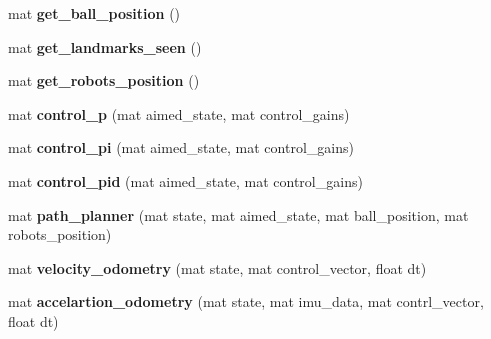 \begin{DoxyCompactItemize}
mat {\bfseries get\+\_\+ball\+\_\+position} ()
\item 
\mbox{\label{class_robot_navigation_acc50daa5ac82e2900f87d2b312afc518}} 
mat {\bfseries get\+\_\+landmarks\+\_\+seen} ()
\item 
\mbox{\label{class_robot_navigation_a9082eefeea50d92c1cf1ea07620733c3}} 
mat {\bfseries get\+\_\+robots\+\_\+position} ()
\item 
\mbox{\label{class_robot_navigation_a81ea2b1ff7b0701a716ab6b8bac92be4}} 
mat {\bfseries control\+\_\+p} (mat aimed\+\_\+state, mat control\+\_\+gains)
\item 
\mbox{\label{class_robot_navigation_aa00a37c4a425f8ba2b83a208845747f5}} 
mat {\bfseries control\+\_\+pi} (mat aimed\+\_\+state, mat control\+\_\+gains)
\item 
\mbox{\label{class_robot_navigation_a5800adf6538584180ca33a2143934dfd}} 
mat {\bfseries control\+\_\+pid} (mat aimed\+\_\+state, mat control\+\_\+gains)
\item 
\mbox{\label{class_robot_navigation_a676195ab5a04e08452dc6fb23f84ce10}} 
mat {\bfseries path\+\_\+planner} (mat state, mat aimed\+\_\+state, mat ball\+\_\+position, mat robots\+\_\+position)
\item 
\mbox{\label{class_robot_navigation_a50667808e539f4b632af5f60628cc228}} 
mat {\bfseries velocity\+\_\+odometry} (mat state, mat control\+\_\+vector, float dt)
\item 
\mbox{\label{class_robot_navigation_a7c37c023dcb318ec260f8d0ad6a1de32}} 
mat {\bfseries accelartion\+\_\+odometry} (mat state, mat imu\+\_\+data, mat contrl\+\_\+vector, float dt)
\end{DoxyCompactItemize}
